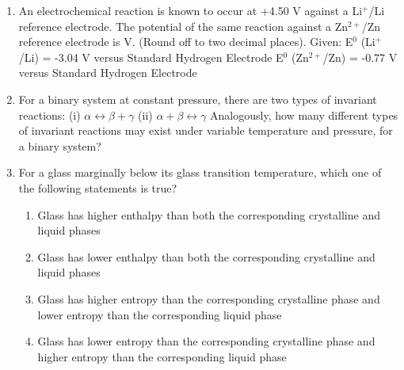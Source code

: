 \documentclass[a4paper,10pt]{article}
\begin{document}
\begin{enumerate}
\hfill{}

\item An electrochemical reaction is known to occur at +4.50 V against a Li$^+$/Li reference electrode. The potential of the same reaction against a Zn$^{2+}$/Zn reference electrode is \underline{\hspace{2cm}} V. (Round off to two decimal places).
Given:
E$^0$ (Li$^+$/Li) = -3.04 V versus Standard Hydrogen Electrode
E$^0$ (Zn$^{2+}$/Zn) = -0.77 V versus Standard Hydrogen Electrode

\hfill{}

\item For a binary system at constant pressure, there are two types of invariant reactions:
(i) $\alpha \leftrightarrow \beta + \gamma$
(ii) $\alpha + \beta \leftrightarrow \gamma$
Analogously, how many different types of invariant reactions may exist under variable temperature and pressure, for a binary system?

\hfill{}
\begin{enumerate}
\end{enumerate}

\item For a glass marginally below its glass transition temperature, which one of the following statements is true?

\hfill{}
\begin{enumerate}
    \item Glass has higher enthalpy than both the corresponding crystalline and liquid phases
    \item Glass has lower enthalpy than both the corresponding crystalline and liquid phases
    \item Glass has higher entropy than the corresponding crystalline phase and lower entropy than the corresponding liquid phase
    \item Glass has lower entropy than the corresponding crystalline phase and higher entropy than the corresponding liquid phase
\end{enumerate}


\end{enumerate}
\end{document}
